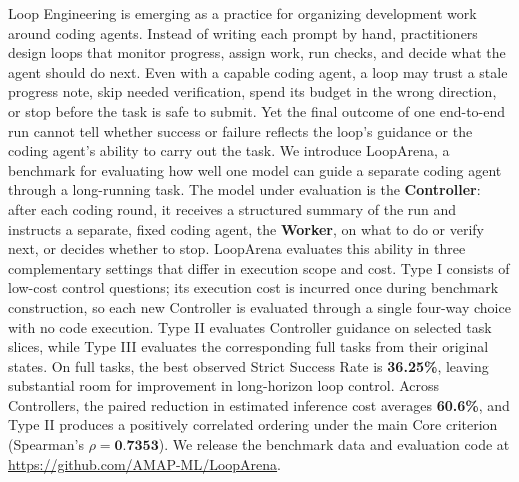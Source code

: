 Loop Engineering is emerging as a practice for organizing development work around coding agents. Instead of writing each prompt by hand, practitioners design loops that monitor progress, assign work, run checks, and decide what the agent should do next.
Even with a capable coding agent, a loop may trust a stale progress note, skip needed verification, spend its budget in the wrong direction, or stop before the task is safe to submit.
Yet the final outcome of one end-to-end run cannot tell whether success or failure reflects the loop's guidance or the coding agent's ability to carry out the task.
We introduce LoopArena, a benchmark for evaluating how well one model can guide a separate coding agent through a long-running task.
The model under evaluation is the \textbf{Controller}: after each coding round, it receives a structured summary of the run and instructs a separate, fixed coding agent, the \textbf{Worker}, on what to do or verify next, or decides whether to stop.
LoopArena evaluates this ability in three complementary settings that differ in execution scope and cost.
Type I consists of \NumTypeI{} low-cost control questions; its execution cost is incurred once during benchmark construction, so each new Controller is evaluated through a single four-way choice with no code execution.
Type II evaluates Controller guidance on \NumTypeII{} selected task slices, while Type III evaluates the corresponding \NumTypeIII{} full tasks from their original states.
On full tasks, the best observed Strict Success Rate is \textbf{36.25\%}, leaving substantial room for improvement in long-horizon loop control.
Across Controllers, the paired reduction in estimated inference cost averages \textbf{60.6\%}, and Type II produces a positively correlated ordering under the main Core criterion (Spearman's \(\rho=\textbf{0.7353}\)).
We release the benchmark data and evaluation code at \url{https://github.com/AMAP-ML/LoopArena}.
